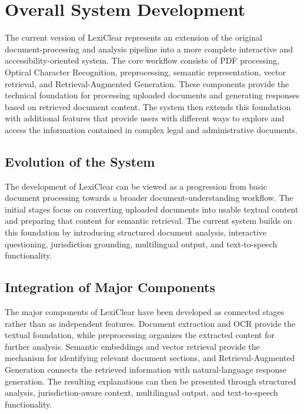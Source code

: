 \documentclass[12pt,a4paper,oneside]{report}
\begin{document}
\section{Overall System Development}

The current version of LexiClear represents an extension of the original
document-processing and analysis pipeline into a more complete interactive
and accessibility-oriented system. The core workflow consists of PDF
processing, Optical Character Recognition, preprocessing, semantic
representation, vector retrieval, and Retrieval-Augmented Generation. These
components provide the technical foundation for processing uploaded documents
and generating responses based on retrieved document content. The system
then extends this foundation with additional features that provide users with
different ways to explore and access the information contained in complex
legal and administrative documents.

\subsection{Evolution of the System}

The development of LexiClear can be viewed as a progression from basic
document processing towards a broader document-understanding workflow. The
initial stages focus on converting uploaded documents into usable textual
content and preparing that content for semantic retrieval. The current system
builds on this foundation by introducing structured document analysis,
interactive questioning, jurisdiction grounding, multilingual output, and
text-to-speech functionality. 

\subsection{Integration of Major Components}

The major components of LexiClear have been developed as connected stages
rather than as independent features. Document extraction and OCR provide the
textual foundation, while preprocessing organizes the extracted content for
further analysis. Semantic embeddings and vector retrieval provide the
mechanism for identifying relevant document sections, and Retrieval-Augmented
Generation connects the retrieved information with natural-language response
generation. The resulting explanations can then be presented through
structured analysis, jurisdiction-aware context, multilingual output, and
text-to-speech functionality.
\end{document}
